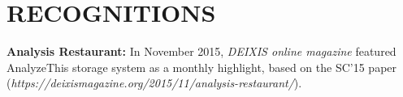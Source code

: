 \section{RECOGNITIONS}
\vspace{0.03in}

{\bf Analysis Restaurant:} In November 2015, \emph{DEIXIS online magazine} featured
AnalyzeThis storage system as a monthly highlight, based on the SC'15 paper
{\small(\emph{https://deixismagazine.org/2015/11/analysis-restaurant/})}.

